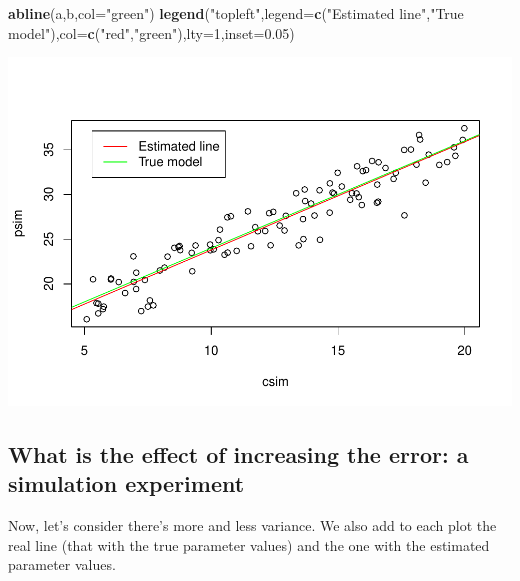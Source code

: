 \documentclass[
]{book}
\newenvironment{Shaded}{\begin{snugshade}}{\end{snugshade}}
\newcommand{\AttributeTok}[1]{\textcolor[rgb]{0.13,0.29,0.53}{#1}}
\newcommand{\DecValTok}[1]{\textcolor[rgb]{0.00,0.00,0.81}{#1}}
\newcommand{\FloatTok}[1]{\textcolor[rgb]{0.00,0.00,0.81}{#1}}
\newcommand{\FunctionTok}[1]{\textcolor[rgb]{0.13,0.29,0.53}{\textbf{#1}}}
\newcommand{\NormalTok}[1]{#1}
\newcommand{\StringTok}[1]{\textcolor[rgb]{0.31,0.60,0.02}{#1}}
\begin{document}
\begin{Shaded}
\begin{Highlighting}[]
\FunctionTok{abline}\NormalTok{(a,b,}\AttributeTok{col=}\StringTok{"green"}\NormalTok{)}
\FunctionTok{legend}\NormalTok{(}\StringTok{"topleft"}\NormalTok{,}\AttributeTok{legend=}\FunctionTok{c}\NormalTok{(}\StringTok{"Estimated line"}\NormalTok{,}\StringTok{"True model"}\NormalTok{),}\AttributeTok{col=}\FunctionTok{c}\NormalTok{(}\StringTok{"red"}\NormalTok{,}\StringTok{"green"}\NormalTok{),}\AttributeTok{lty=}\DecValTok{1}\NormalTok{,}\AttributeTok{inset=}\FloatTok{0.05}\NormalTok{)}
\end{Highlighting}
\end{Shaded}

\includegraphics{ECOMODbook_files/figure-latex/a6.26-1.pdf}

\hypertarget{what-is-the-effect-of-increasing-the-error-a-simulation-experiment}{%
\subsection{What is the effect of increasing the error: a simulation experiment}\label{what-is-the-effect-of-increasing-the-error-a-simulation-experiment}}

Now, let's consider there's more and less variance. We also add to each plot the real line (that with the true parameter values) and the one with the estimated parameter values.
\end{document}
